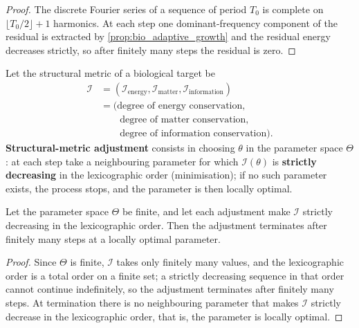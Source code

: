 \begin{proof}
The discrete Fourier series of a sequence of period $T_0$ is complete on $\lfloor T_0/2\rfloor+1$ harmonics. At each step one dominant-frequency component of the residual is extracted by \cref{prop:bio_adaptive_growth} and the residual energy decreases strictly, so after finitely many steps the residual is zero.
\end{proof}

\begin{definition}\label{def:bio_structure_metric_adjustment}
Let the structural metric of a biological target be
\[
\begin{aligned}
\mathcal I&=(\mathcal I_{\text{energy}},\mathcal I_{\text{matter}},\mathcal I_{\text{information}})\\
&=\bigl(\text{degree of energy conservation},\\
&\qquad\text{degree of matter conservation},\\
&\qquad\text{degree of information conservation}\bigr).
\end{aligned}
\]
\textbf{Structural-metric adjustment} consists in choosing $\theta$ in the parameter space $\Theta$: at each step take a neighbouring parameter for which $\mathcal I(\theta)$ is \textbf{strictly decreasing} in the lexicographic order (minimisation); if no such parameter exists, the process stops, and the parameter is then locally optimal.
\end{definition}

\begin{proposition}\label{prop:bio_structure_metric_convergence}
Let the parameter space $\Theta$ be finite, and let each adjustment make $\mathcal I$ strictly decreasing in the lexicographic order. Then the adjustment terminates after finitely many steps at a locally optimal parameter.
\end{proposition}

\begin{proof}
Since $\Theta$ is finite, $\mathcal I$ takes only finitely many values, and the lexicographic order is a total order on a finite set; a strictly decreasing sequence in that order cannot continue indefinitely, so the adjustment terminates after finitely many steps. At termination there is no neighbouring parameter that makes $\mathcal I$ strictly decrease in the lexicographic order, that is, the parameter is locally optimal.
\end{proof}

